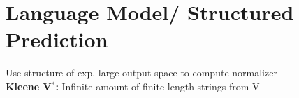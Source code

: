 \begin{comment}
	\pagebreak
\end{comment}

\section{Language Model/ Structured Prediction}
\begin{comment}
\subsection{Structure}

	\begin{itemize}
	
	\item Structured Prediction
	\begin{itemize}
	\item What is it
	\item Kleene Closure
	\item Prefix Tree
	\item Local Normalization
	\end{itemize}
	
	\item Neural n-gram models
	\begin{itemize}
	\item n-gram Language Modelling
	\item Log-Linear and MLP
	\item Linguistic Limitations
	\end{itemize}
	
	\item Recurrent Neural Networks
	\begin{itemize}
	\item Elman networks (Vanilla RNN)
	\item GRUs and LSTMs
	\item Backpropagation Through Time
	\end{itemize}
	\end{itemize}
\end{comment}

Use structure of exp. large output space to compute normalizer\\

\textbf{Kleene V$^*$:} Infinite amount of finite-length strings from V\\
\begin{comment}
	Using BOS and EOS as delimiter, it can be seen as a prefix tree.
	Each leaf is an EOS token.
	The number of paths through the tree is infinite, whereas each path is finite.
	A Language model is a weighting of this tree, more precise, a weighting of the edges of the tree. We Need to normalise a specific path with the weight of all paths.\\
\end{comment}  

